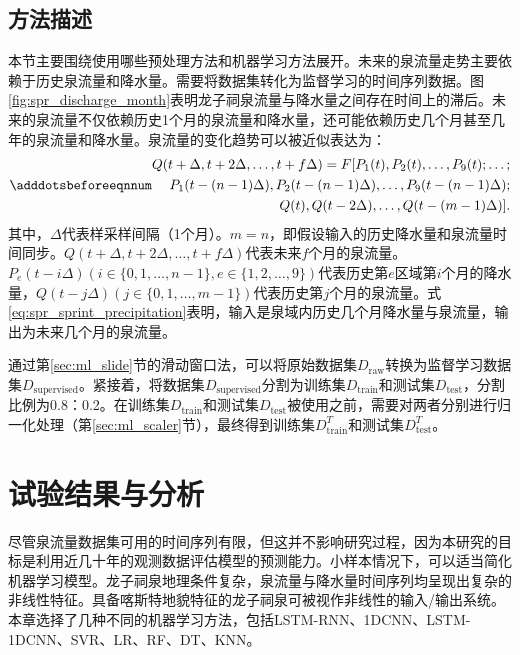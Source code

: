 \subsection{方法描述}\label{sec:spr_method}

本节主要围绕使用哪些预处理方法和机器学习方法展开。未来的泉流量走势主要依赖于历史泉流量和降水量。需要将数据集转化为监督学习的时间序列数据。图\ref{fig:spr_discharge_month}表明龙子祠泉流量与降水量之间存在时间上的滞后。未来的泉流量不仅依赖历史1个月的泉流量和降水量，还可能依赖历史几个月甚至几年的泉流量和降水量。泉流量的变化趋势可以被近似表达为：
\begin{equation}\adddotsbeforeeqnnum
  \label{eq:spr_sprint_precipitation}
  \begin{split}
    Q(t+\Delta,t+2\Delta,\ldots,t+f\Delta)=F[P_1(t),P_2(t),\ldots,P_9(t);\ldots;\\
    P_1(t-(n-1)\Delta),P_2(t-(n-1)\Delta),\ldots,P_9(t-(n-1)\Delta);\\
    Q(t),Q(t-2\Delta),\ldots,Q(t-(m-1)\Delta)].
  \end{split}
\end{equation}
其中，$\Delta$代表样采样间隔（1个月）。$m=n$，即假设输入的历史降水量和泉流量时间同步。$Q(t+\Delta,t+2\Delta,\ldots,t+f\Delta)$代表未来$f$个月的泉流量。$P_e(t-i\Delta)(i\in\{0,1,\ldots,n-1\},e\in\{1,2,\ldots,9\})$代表历史第$e$区域第$i$个月的降水量，$Q(t-j\Delta)(j\in\{0,1,\ldots,m-1\})$代表历史第$j$个月的泉流量。式\ref{eq:spr_sprint_precipitation}表明，输入是泉域内历史几个月降水量与泉流量，输出为未来几个月的泉流量。

通过第\ref{sec:ml_slide}节的滑动窗口法，可以将原始数据集$D_{\text{raw}}$转换为监督学习数据集$D_{\text{supervised}}$。紧接着，将数据集$D_{\text{supervised}}$分割为训练集$D_{\text{train}}$和测试集$D_{\text{test}}$，分割比例为0.8：0.2。在训练集$D_{\text{train}}$和测试集$D_{\text{test}}$被使用之前，需要对两者分别进行归一化处理（第\ref{sec:ml_scaler}节），最终得到训练集$D^T_{\text{train}}$和测试集$D^T_{\text{test}}$。

\section{试验结果与分析}\label{sec:spr_result}

尽管泉流量数据集可用的时间序列有限，但这并不影响研究过程，因为本研究的目标是利用近几十年的观测数据评估模型的预测能力。小样本情况下，可以适当简化机器学习模型。龙子祠泉地理条件复杂，泉流量与降水量时间序列均呈现出复杂的非线性特征。具备喀斯特地貌特征的龙子祠泉可被视作非线性的输入/输出系统。本章选择了几种不同的机器学习方法，包括LSTM-RNN、1DCNN、LSTM-1DCNN、SVR、LR、RF、DT、KNN。

